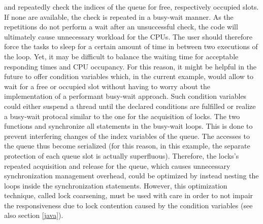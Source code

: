  and  repeatedly check the indices of the queue for free, respectively occupied slots. If none are available, the check is repeated in a busy-wait manner. As the repetitions do not perform a wait after an unsuccessful check, the code will ultimately cause unnecessary workload for the CPUs. The user should therefore force the tasks to sleep for a certain amount of time in between two executions of the loop. Yet, it may be difficult to balance the waiting time for acceptable responding times and CPU occupancy. For this reason, it might be helpful in the future to offer condition variables which, in the current example, would allow  to wait for a free or occupied slot without having to worry about the implementation of a performant busy-wait approach. Such condition variables could either suspend a thread until the declared conditions are fulfilled or realize a busy-wait protocal similar to the one for the acquisition of locks. The two functions  and  synchronize all statements in the busy-wait loops. This is done to prevent interfering changes of the index variables of the queue. The accesses to the queue thus become serialized (for this reason, in this example, the separate protection of each queue slot is actually superfluous). Therefore, the locks's repeated acquisition and release for the queue, which causes unnecessary synchronization management overhead, could be optimized by instead nesting the loops inside the synchronization statements. However, this optimization technique, called lock coarsening, must be used with care in order to not impair the responsiveness due to lock contention caused by the condition variables (see also section \ref{java}).

